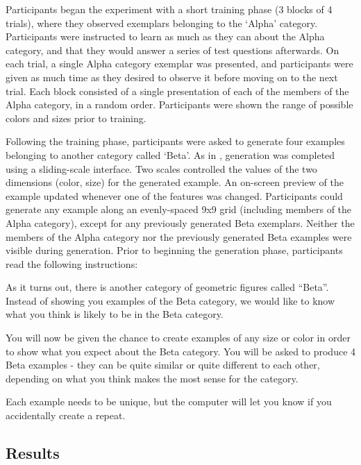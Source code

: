 \documentclass[12pt]{article}
\begin{document}
\begin{flushleft}
Participants began the experiment with a short training phase (3 blocks of 4
trials), where they observed exemplars belonging to the `Alpha' category.
Participants were instructed to learn as much as they can about the Alpha
category, and that they would answer a series of test questions afterwards. On
each trial, a single Alpha category exemplar was presented, and participants
were given as much time as they desired to observe it before moving on to the
next trial. Each block consisted of a single presentation of each of the members
of the Alpha category, in a random order. Participants were shown the range of
possible colors and sizes prior to training.

Following the training phase, participants were asked to generate four examples
belonging to another category called `Beta'. As in
\citet{jern2013probabilistic}, generation was completed using a sliding-scale
interface. Two scales controlled the values of the two dimensions (color, size)
for the generated example. An on-screen preview of the example updated whenever
one of the features was changed. Participants could generate any example along
an evenly-spaced 9x9 grid (including members of the Alpha category), except for
any previously generated Beta exemplars. Neither the members of the Alpha
category nor the previously generated Beta examples were visible during
generation. Prior to beginning the generation phase, participants read the
following instructions:

\begin{displayquote} As it turns out, there is another category of geometric
figures called ``Beta''. Instead of showing you examples of the Beta category,
we would like to know what you think is likely to be in the Beta category.

You will now be given the chance to create examples of any size or color in
order to show what you expect about the Beta category. You will be asked to
produce 4 Beta examples - they can be quite similar or quite different to each
other, depending on what you think makes the most sense for the category.

Each example needs to be unique, but the computer will let you know if you
accidentally create a repeat.
\end{displayquote}

\subsection{Results}


\end{flushleft}
\end{document}
